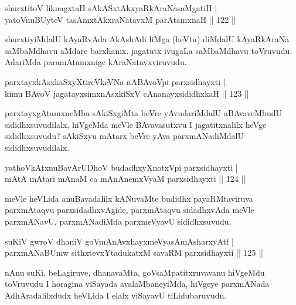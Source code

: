 
\begin{shl}
shurxtitoV liknagxtaH sAkASxtAkxyaRkAraNasaMgatiH |\\
yatoV\s nuBUyteV tasAmxtAkxraNatavxM parAtamxnaH \hfill || 122 ||
\end{shl}

\begin{artha}
shurxtiyiMdalU kAyaRvAda AkAshAdi liMga (heVtu) diMdalU kAyaRkAraNa saMbaMdhavu aMdare barxhamx. jagatutx ivugaLa saMbaMdhavu toVruvudu. AdariMda paramAtamxnige kAraNatavxviruvudu.
\end{artha}

\begin{shl}
parxtayxkAsxkaSxyXtireVkeVNa nABAvoV\s pi parxsidhayxti |\\
kimu BAvoV jagatayxsimxnAsxkiSxV cAnanayxsididhxkaH \hfill || 123 ||
\end{shl}

\begin{artha}
parxtayxgAtamxneMba sAkiSxgiMta beVre yAvudariMdalU aBAvaveMbudU sididhxsuvudilalx, hiVgeMda meVle BAvavasutxvu I jagatitxnalilx heVge sididhxsuvudu? sAkiSxyu mAtarx beVre yAva parxmANadiMdalU sididhxsuvudilalx.
\end{artha}

\begin{shl}
yathoVkAtxnuBavArUDhoV budadhxyXnotxV\s pi parxsidhayxti |\\
mAtA mAtari mAnaM ca mAnAnemxVyaM parxsidhayxti \hfill || 124 ||
\end{shl}

\begin{artha}
meVle heVLida anuBavadalilx kANuvaMte budidhx payaRMtaviruva parxmAtaqvu parxsidadhxvAgide, parxmAtaqvu sidadhxvAda meVle parxmANavU, parxmANadiMda parxmeVyavU sididhxsuvudu.
\end{artha}


\begin{shl}
suKiV gwroV dhaniV goVmAnAvxhayxmeVyasAmAsharxyAtf |\\
parxmANaBUmw sithxtevxYtadukatxM savaRM parxsidhayxti \hfill || 125 ||
\end{shl}

\begin{artha}
nAnu suKi, beLagiruve, dhanavaMta, goVsaMpatitxruvavanu hiVgeMdu toVruvudu I horagina viSayada avalaMbaneyiMda, hiVgeye parxmANada AdhAradalilxdudx heVLida I elalx viSayavU tiLidubaruvudu.
\end{artha}

